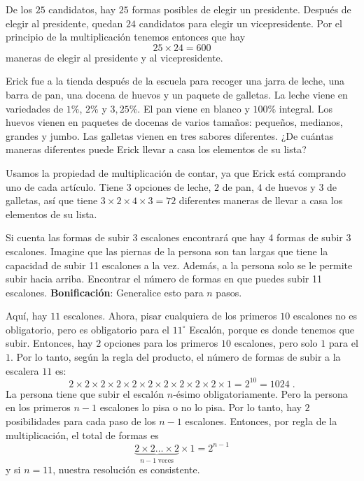 \documentclass[12pt]{article}
\begin{document}
\begin{solucion}
De los $25$ candidatos, hay $25$ formas posibles de elegir un presidente. Después de elegir al presidente, quedan $24$ candidatos para elegir un vicepresidente. Por el principio de la multiplicación tenemos entonces que hay
\[25\times 24=600\]
maneras de elegir al presidente y al vicepresidente.
\end{solucion}

\begin{ejemplo}
    Erick fue a la tienda después de la escuela para recoger una jarra de leche, una barra de pan, una docena de huevos y un paquete de galletas. La leche viene en variedades de $1\%$, $2\%$ y $3,25\%$. El pan viene en blanco y $100\%$ integral. Los huevos vienen en paquetes de docenas de varios tamaños: pequeños, medianos, grandes y jumbo. Las galletas vienen en tres sabores diferentes. ¿De cuántas maneras diferentes puede Erick llevar a casa los elementos de su lista?
\end{ejemplo}

\begin{solucion}
Usamos la propiedad de multiplicación de contar, ya que Erick está comprando uno de cada artículo. Tiene $3$ opciones de leche, $2$ de pan, $4$ de huevos y $3$ de galletas, así que tiene $3\times 2 \times 4 \times 3=72$ diferentes maneras de llevar a casa los elementos de su lista.
\end{solucion}

\begin{ejemplo}
Si cuenta las formas de subir 3 escalones encontrará que hay 4 formas de subir 3 escalones. Imagine que las piernas de la persona son tan largas que tiene la capacidad de subir 11 escalones a la vez. Además, a la persona solo se le permite subir hacia arriba. Encontrar el número de formas en que puedes subir 11 escalones. \textbf{Bonificación}: Generalice esto para $n$ pasos.
\end{ejemplo}

\begin{solucion}
Aquí, hay $11$ escalones. Ahora, pisar cualquiera de los primeros $10$ escalones no es obligatorio, pero es obligatorio para el $11^\circ$ Escalón, porque es donde tenemos que subir. Entonces, hay $2$ opciones para los primeros $10$ escalones, pero solo $1$ para el $1$. Por lo tanto, según la regla del producto, el número de formas de subir a la escalera $11$ es:
\[2\times 2\times 2\times 2\times 2\times 2\times 2\times 2\times 2\times 2\times 1=2^{10}=1024\;. \]
La persona tiene que subir el escalón $n$-ésimo obligatoriamente. Pero la persona en los primeros $n-1$ escalones lo pisa o no lo pisa. Por lo tanto, hay $2$ posibilidades para cada paso de los $n-1$ escalones. Entonces, por regla de la multiplicación, el total de formas es \[\underbrace{2\times 2 \ldots \times 2}_{n-1\;\text{veces}}\times 1=2^{n-1}\]
y si $n=11$, nuestra resolución es consistente.
\end{solucion}
\end{document}
